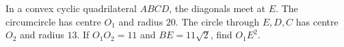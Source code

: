 In a convex cyclic quadrilateral $ABCD$, the diagonals meet at $E$. The circumcircle has centre $O_1$ and radius $20$. The circle through $E,D,C$ has centre $O_2$ and radius $13$. If $O_1O_2=11$ and $BE=11\sqrt2$, find $O_1E^2$.
